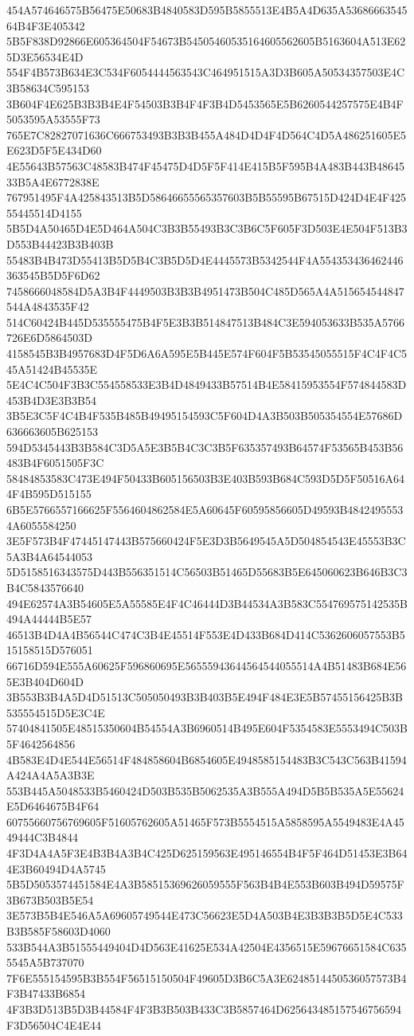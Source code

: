 {{{{{{{{{{{{{{{{{{{{{454A574646575B56475E50683B4840583D595B5855513E4B5A4D635A5368666354564B4F3E405342
5B5F838D92866E605364504F54673B54505460535164605562605B5163604A513E625D3E56534E4D
554F4B573B634E3C534F6054444563543C464951515A3D3B605A50534357503E4C3B58634C595153
3B604F4E625B3B3B4E4F54503B3B4F4F3B4D5453565E5B6260544257575E4B4F5053595A53555F73
765E7C82827071636C666753493B3B3B455A484D4D4F4D564C4D5A486251605E5E623D5F5E434D60
4E55643B57563C48583B474F45475D4D5F5F414E415B5F595B4A483B443B4864533B5A4E6772838E
767951495F4A425843513B5D58646655565357603B5B55595B67515D424D4E4F42555445514D4155
5B5D4A50465D4E5D464A504C3B3B55493B3C3B6C5F605F3D503E4E504F513B3D553B44423B3B403B
55483B4B473D55413B5D5B4C3B5D5D4E4445573B5342544F4A554353436462446363545B5D5F6D62
7458666048584D5A3B4F4449503B3B3B4951473B504C485D565A4A515654544847544A4843535F42
514C60424B445D535555475B4F5E3B3B514847513B484C3E594053633B535A5766726E6D5864503D
4158545B3B4957683D4F5D6A6A595E5B445E574F604F5B53545055515F4C4F4C545A51424B45535E
5E4C4C504F3B3C554558533E3B4D4849433B57514B4E58415953554F574844583D453B4D3E3B3B54
3B5E3C5F4C4B4F535B485B49495154593C5F604D4A3B503B505354554E57686D636663605B625153
594D5345443B3B584C3D5A5E3B5B4C3C3B5F635357493B64574F53565B453B56483B4F6051505F3C
58484853583C473E494F50433B605156503B3E403B593B684C593D5D5F50516A644F4B595D515155
6B5E5766557166625F5564604862584E5A60645F60595856605D49593B48424955534A6055584250
3E5F573B4F47445147443B575660424F5E3D3B5649545A5D504854543E45553B3C5A3B4A64544053
5D5158516343575D443B556351514C56503B51465D55683B5E645060623B646B3C3B4C5843576640
494E62574A3B54605E5A55585E4F4C46444D3B44534A3B583C554769575142535B494A44444B5E57
46513B4D4A4B56544C474C3B4E45514F553E4D433B684D414C5362606057553B515158515D576051
66716D594E555A60625F596860695E56555943644564544055514A4B51483B684E565E3B404D604D
3B553B3B4A5D4D51513C505050493B3B403B5E494F484E3E5B57455156425B3B535554515D5E3C4E
57404841505E48515350604B54554A3B6960514B495E604F5354583E5553494C503B5F4642564856
4B583E4D4E544E56514F484858604B6854605E4948585154483B3C543C563B41594A424A4A5A3B3E
553B445A5048533B5460424D503B535B5062535A3B555A494D5B5B535A5E55624E5D6464675B4F64
60755660756769605F51605762605A51465F573B5554515A5858595A5549483E4A4549444C3B4844
4F3D4A4A5F3E4B3B4A3B4C425D625159563E495146554B4F5F464D51453E3B644E3B60494D4A5745
5B5D5053574451584E4A3B58515369626059555F563B4B4E553B603B494D59575F3B673B503B5E54
3E573B5B4E546A5A69605749544E473C56623E5D4A503B4E3B3B3B5D5E4C533B3B585F58603D4060
533B544A3B51555449404D4D563E41625E534A42504E4356515E59676651584C6355545A5B737070
7F6E555154595B3B554F56515150504F49605D3B6C5A3E6248514450536057573B4F3B47433B6854
4F3B3D513B5D3B44584F4F3B3B503B433C3B5857464D625643485157546756594F3D56504C4E4E44
}}}}}}}}}}}}}}}}}}}}}
